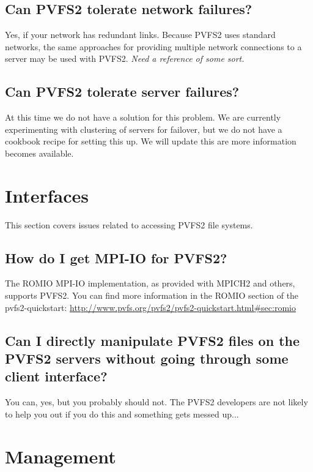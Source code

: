 \documentclass[11pt,letterpaper]{article}
\begin{document}
\subsection{Can PVFS2 tolerate network failures?}

Yes, if your network has redundant links.  Because PVFS2 uses standard
networks, the same approaches for providing multiple network connections to a
server may be used with PVFS2.  \emph{Need a reference of some sort.}

\subsection{Can PVFS2 tolerate server failures?}

At this time we do not have a solution for this problem.  We are currently
experimenting with clustering of servers for failover, but we do not have a
cookbook recipe for setting this up.  We will update this are more information
becomes available.

%
%
\section{Interfaces}

This section covers issues related to accessing PVFS2 file systems.

\subsection{How do I get MPI-IO for PVFS2?}

The ROMIO MPI-IO implementation, as provided with MPICH2 and others, supports
PVFS2.  You can find more information in the ROMIO section of the
pvfs2-quickstart: \url{http://www.pvfs.org/pvfs2/pvfs2-quickstart.html\#sec:romio}

\subsection{Can I directly manipulate PVFS2 files on the PVFS2 servers
            without going through some client interface?}

You can, yes, but you probably should not.  The PVFS2 developers are not
likely to help you out if you do this and something gets messed up...

%
%
\section{Management}
\end{document}
